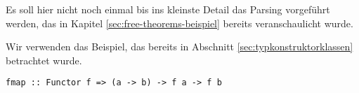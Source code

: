 Es soll hier nicht noch einmal bis ins kleinste Detail das Parsing vorgeführt werden, das in Kapitel \ref{sec:free-theorems-beispiel} bereits
veranschaulicht wurde.


Wir verwenden das Beispiel, das bereits in Abschnitt \ref{sec:typkonstruktorklassen} betrachtet wurde.

\begin{verbatim}
fmap :: Functor f => (a -> b) -> f a -> f b
\end{verbatim}

